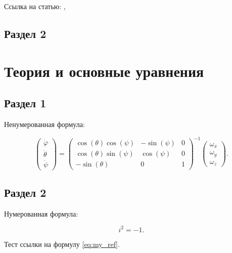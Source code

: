 \documentclass[a4paper,14pt]{extarticle}
\begin{document}
    Ссылка на статью: \cite{Miller2}, \cite{Mohseni}

\subsection{Раздел 2}

\pagebreak
\section{Теория и основные уравнения}

\subsection{Раздел 1}

Ненумерованная формула:

\begin{equation}
    \begin{pmatrix} \dot{\varphi}\\ \dot{\theta} \\ \dot{\psi} \end{pmatrix}
    = \begin{pmatrix}
        \cos(\theta)\cos(\psi) & -\sin(\psi) & 0 \\
        \cos(\theta)\sin(\psi) & \cos(\psi)  & 0 \\
        -\sin(\theta)         & 0         &  1
    \end{pmatrix}^{-1}
    \begin{pmatrix} \omega_x\\ \omega_y \\ \omega_z \end{pmatrix}.
\end{equation}

\subsection{Раздел 2}

Нумерованная формула:

\begin{equation}
    i^2 = -1.
    \label{eq:my_ref}
\end{equation}

Тест ссылки на формулу \ref{eq:my_ref}.

\pagebreak
\end{document}
